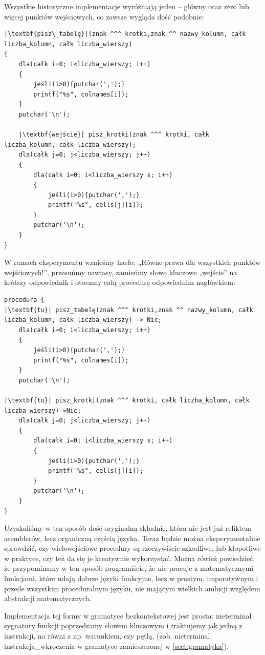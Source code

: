 Wszystkie historyczne implementacje wyróżniają jeden – główny oraz zero lub więcej punktów wejściowych, co zawsze wygląda dość podobnie:
\lstset{
    escapechar=|,
    breaklines=true
}
\begin{lstlisting}
|\textbf{pisz\_tabelę}|(znak ^^^ krotki,znak ^^ nazwy_kolumn, całk liczba_kolumn, całk liczba_wierszy)
{
    dla(całk i=0; i<liczba_wierszy; i++)
    {
        jeśli(i>0){putchar(',');}
        printf("%s", colnames[i]);
    }
    putchar('\n');
    
    |\textbf{wejście}| pisz_krotki(znak ^^^ krotki, całk liczba_kolumn, całk liczba_wierszy);
    dla(całk j=0; j<liczba_wierszy; j++)
    {
        dla(całk i=0; i<liczba_wierszy s; i++)
        {
            jeśli(i>0){putchar(',');}
            printf("%s", cells[j][i]);
        }
        putchar('\n');
    }
}
\end{lstlisting}
W ramach eksperymentu wznieśmy hasło: „Równe prawa dla wszystkich punktów wejściowych!”, przesuńmy nawiasy,  zamieńmy słowo kluczowe „wejście” na krótszy odpowiednik i otoczmy całą procedurę odpowiednim nagłówkiem:
\begin{lstlisting}
procedura {
|\textbf{tu}| pisz_tabelę(znak ^^^ krotki,znak ^^ nazwy_kolumn, całk liczba_kolumn, całk liczba_wierszy) -> Nic;
    dla(całk i=0; i<liczba_wierszy; i++)
    {
        jeśli(i>0){putchar(',');}
        printf("%s", colnames[i]);
    }
    putchar('\n');
    
|\textbf{tu}| pisz_krotki(znak ^^^ krotki, całk liczba_kolumn, całk liczba_wierszy)->Nic;
    dla(całk j=0; j<liczba_wierszy; j++)
    {
        dla(całk i=0; i<liczba_wierszy s; i++)
        {
            jeśli(i>0){putchar(',');}
            printf("%s", cells[j][i]);
        }
        putchar('\n');
    }
}
\end{lstlisting}
Uzyskaliśmy w ten sposób dość oryginalną składnię, która nie jest już reliktem asemblerów, lecz organiczną częścią języka. Teraz będzie można eksperymentalnie sprawdzić, czy wielowejściowe procedury są rzeczywiście szkodliwe, lub kłopotliwe w praktyce, czy też da się je kreatywnie wykorzystać. Można rówież powiedzieć, że przypominamy w ten sposób programiście, że nie pracuje z matematycznymi funkcjami, które udają dobrze języki funkcyjne, lecz w prostym, imperatywnym i przede wszystkim proceduralnym języku, nie mającym wielkich ambicji względem abstrakcji matematycznych.

Implementacja tej formy w gramatyce bezkontekstowej jest prosta: nieterminal sygnatury funkcji poprzedzamy słowem kluczowym i traktujemy jak jedną z instrukcji, na równi z np. warunkiem, czy pętlą, (zob. nieterminal instrukcja\_wkroczenia w gramatyce zamieszczonej w \ref{sect:gramatyka}).

